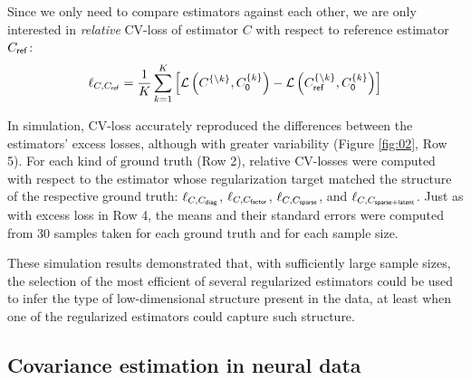 \documentclass[10pt]{article}
\newcommand{\loss}[1]{\mathcal L\left(#1\right)}
\begin{document}
Since we only need to compare estimators against each other, we are only interested in \emph{relative} CV-loss of estimator $C$ with respect to reference estimator $C_{\sf ref}$:
\begin{equation}\label{eq:rel-cv-loss}
    \ell_{C,C_{\sf ref}} = \frac 1 K \sum\limits_{k=1}^K \left[
        \loss{C^{\{\setminus k\}},C_{\sf 0}^{\{k\}}} -
    \loss{C_{\sf ref}^{\{\setminus k\}},C_{\sf 0}^{\{k\}}} 
\right]
\end{equation}

In simulation, CV-loss accurately reproduced the differences between the estimators' excess losses, although with greater variability (Figure \ref{fig:02}, Row 5). For each kind of ground truth (Row 2), relative CV-losses were computed with respect to the estimator whose regularization target matched the structure of the respective ground truth: $\ell_{C,C_{\sf diag}}$, $\ell_{C,C_{\sf factor}}$, $\ell_{C,C_{\sf sparse}}$, and $\ell_{C,C_{\sf sparse+latent}}$. Just as with excess loss in Row 4, the means and their standard errors were computed from 30 samples  taken for each ground truth and for each sample size.

These simulation results demonstrated that, with sufficiently large sample sizes, the selection of the most efficient of several regularized estimators could be used to infer the type of low-dimensional structure present in the data, at least when one of the regularized estimators could capture such structure.

\subsection*{Covariance estimation in neural data}
\end{document}
